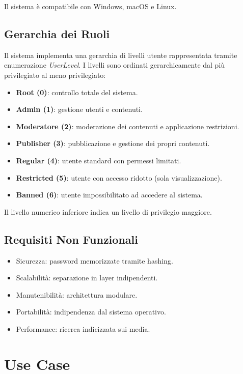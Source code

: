\documentclass[12pt,a4paper]{article}
\begin{document}
Il sistema è compatibile con Windows, macOS e Linux.

\subsection{Gerarchia dei Ruoli}

Il sistema implementa una gerarchia di livelli utente rappresentata tramite enumerazione \textit{UserLevel}.  
I livelli sono ordinati gerarchicamente dal più privilegiato al meno privilegiato:

\begin{itemize}
    \item \textbf{Root (0)}: controllo totale del sistema.
    \item \textbf{Admin (1)}: gestione utenti e contenuti.
    \item \textbf{Moderatore (2)}: moderazione dei contenuti e applicazione restrizioni.
    \item \textbf{Publisher (3)}: pubblicazione e gestione dei propri contenuti.
    \item \textbf{Regular (4)}: utente standard con permessi limitati.
    \item \textbf{Restricted (5)}: utente con accesso ridotto (sola visualizzazione).
    \item \textbf{Banned (6)}: utente impossibilitato ad accedere al sistema.
\end{itemize}

Il livello numerico inferiore indica un livello di privilegio maggiore.


\subsection{Requisiti Non Funzionali}

\begin{itemize}
    \item Sicurezza: password memorizzate tramite hashing.
    \item Scalabilità: separazione in layer indipendenti.
    \item Manutenibilità: architettura modulare.
    \item Portabilità: indipendenza dal sistema operativo.
    \item Performance: ricerca indicizzata sui media.
\end{itemize}

\section{Use Case}
\end{document}
